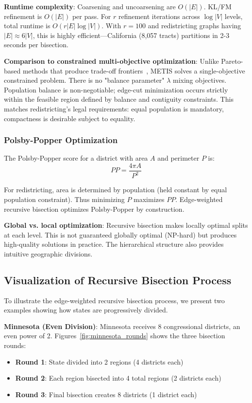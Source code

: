 \textbf{Runtime complexity}: Coarsening and uncoarsening are $O(|E|)$. KL/FM refinement is $O(|E|)$ per pass. For $r$ refinement iterations across $\log|V|$ levels, total runtime is $O(r|E|\log|V|)$. With $r=100$ and redistricting graphs having $|E| \approx 6|V|$, this is highly efficient—California (8,057 tracts) partitions in 2-3 seconds per bisection.

\textbf{Comparison to constrained multi-objective optimization}: Unlike Pareto-based methods that produce trade-off frontiers~\cite{zitzler2001spea2}, METIS solves a single-objective constrained problem. There is no "balance parameter" $\lambda$ mixing objectives. Population balance is non-negotiable; edge-cut minimization occurs strictly within the feasible region defined by balance and contiguity constraints. This matches redistricting's legal requirements: equal population is mandatory, compactness is desirable subject to equality.

\subsubsection{Polsby-Popper Optimization}

The Polsby-Popper score for a district with area $A$ and perimeter $P$ is:
\[
PP = \frac{4\pi A}{P^2}
\]

For redistricting, area is determined by population (held constant by equal population constraint). Thus minimizing $P$ maximizes $PP$. Edge-weighted recursive bisection optimizes Polsby-Popper by construction.

\textbf{Global vs. local optimization}: Recursive bisection makes locally optimal splits at each level. This is not guaranteed globally optimal (NP-hard) but produces high-quality solutions in practice. The hierarchical structure also provides intuitive geographic divisions.

\subsection{Visualization of Recursive Bisection Process}

To illustrate the edge-weighted recursive bisection process, we present two examples showing how states are progressively divided.

\textbf{Minnesota (Even Division)}: Minnesota receives 8 congressional districts, an even power of 2. Figures~\ref{fig:minnesota_rounds} shows the three bisection rounds:
\begin{itemize}
\item \textbf{Round 1}: State divided into 2 regions (4 districts each)
\item \textbf{Round 2}: Each region bisected into 4 total regions (2 districts each)
\item \textbf{Round 3}: Final bisection creates 8 districts (1 district each)
\end{itemize}


